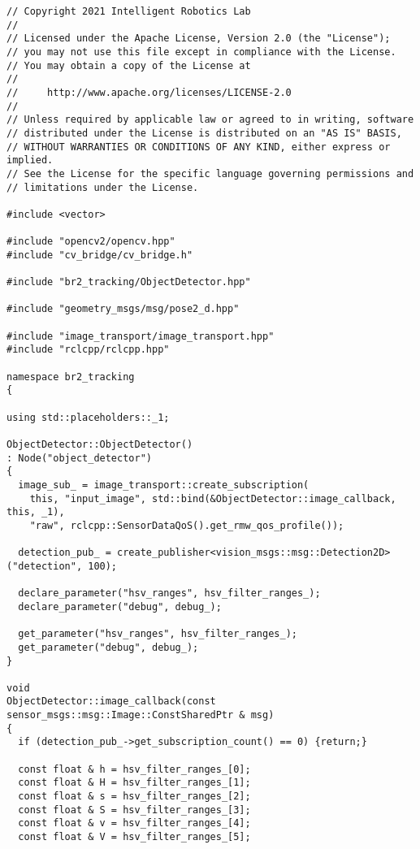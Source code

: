  \footnotesize
\begin{tcolorbox}[sharp corners, colframe=gray!80, colback=LightGray, left=0pt, top=0pt, bottom=0pt, title=\texttt{br2\_tracking/src/br2\_tracking/ObjectDetector.cpp}]
  \begin{verbatim}
// Copyright 2021 Intelligent Robotics Lab
//
// Licensed under the Apache License, Version 2.0 (the "License");
// you may not use this file except in compliance with the License.
// You may obtain a copy of the License at
//
//     http://www.apache.org/licenses/LICENSE-2.0
//
// Unless required by applicable law or agreed to in writing, software
// distributed under the License is distributed on an "AS IS" BASIS,
// WITHOUT WARRANTIES OR CONDITIONS OF ANY KIND, either express or implied.
// See the License for the specific language governing permissions and
// limitations under the License.

#include <vector>

#include "opencv2/opencv.hpp"
#include "cv_bridge/cv_bridge.h"

#include "br2_tracking/ObjectDetector.hpp"

#include "geometry_msgs/msg/pose2_d.hpp"

#include "image_transport/image_transport.hpp"
#include "rclcpp/rclcpp.hpp"

namespace br2_tracking
{

using std::placeholders::_1;

ObjectDetector::ObjectDetector()
: Node("object_detector")
{
  image_sub_ = image_transport::create_subscription(
    this, "input_image", std::bind(&ObjectDetector::image_callback, this, _1),
    "raw", rclcpp::SensorDataQoS().get_rmw_qos_profile());

  detection_pub_ = create_publisher<vision_msgs::msg::Detection2D>("detection", 100);

  declare_parameter("hsv_ranges", hsv_filter_ranges_);
  declare_parameter("debug", debug_);

  get_parameter("hsv_ranges", hsv_filter_ranges_);
  get_parameter("debug", debug_);
}

void
ObjectDetector::image_callback(const sensor_msgs::msg::Image::ConstSharedPtr & msg)
{
  if (detection_pub_->get_subscription_count() == 0) {return;}

  const float & h = hsv_filter_ranges_[0];
  const float & H = hsv_filter_ranges_[1];
  const float & s = hsv_filter_ranges_[2];
  const float & S = hsv_filter_ranges_[3];
  const float & v = hsv_filter_ranges_[4];
  const float & V = hsv_filter_ranges_[5];


\end{verbatim}
\end{tcolorbox}
